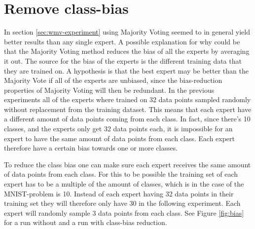 
\section{Remove class-bias}
\label{sec:reduce-bias}

In section \ref{sec:wmv-experiment} using Majority Voting seemed to in general yield better results than any single expert. A possible explanation for why could be that the Majority Voting method reduces the bias of all the experts by averaging it out. The source for the bias of the experts is the different training data that they are trained on. A hypothesis is that the best expert may be better than the Majority Vote if all of the experts are unbiased, since the bias-reduction properties of Majority Voting will then be redundant. In the previous experiments all of the experts where trained on 32 data points sampled randomly without replacement from the training dataset. This means that each expert have a different amount of data points coming from each class. In fact, since there's 10 classes, and the experts only get 32 data points each, it is impossible for an expert to have the same amount of data points from each class. Each expert therefore have a certain bias towards one or more classes.

To reduce the class bias one can make sure each expert receives the same amount of data points from each class. For this to be possible the training set of each expert has to be a multiple of the amount of classes, which is in the case of the MNIST-problem is 10. Instead of each expert having 32 data points in their training set they will therefore only have 30 in the following experiment. Each expert will randomly sample 3 data points from each class. See Figure \ref{fig:bias} for a run without and a run with class-bias reduction.


